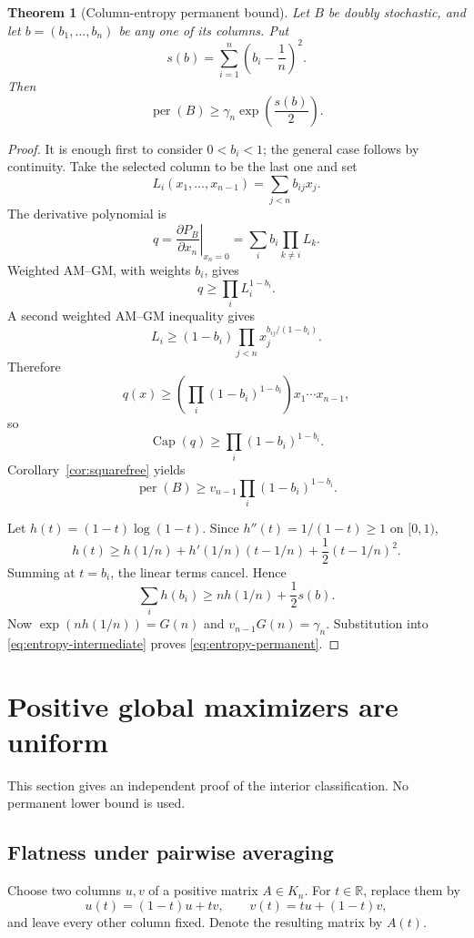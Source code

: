 \documentclass[11pt]{article}
\newtheorem{theorem}{Theorem}[section]
\theoremstyle{definition}
\newcommand{\per}{\operatorname{per}}
\newcommand{\pcap}{\operatorname{Cap}}
\newcommand{\1}{\mathbf{1}}
\begin{document}
\begin{theorem}[Column-entropy permanent bound]\label{thm:column-entropy}
Let $B$ be doubly stochastic, and let $b=(b_1,\dots,b_n)$ be any one of its columns.  Put
\[
 s(b)=\sum_{i=1}^n\left(b_i-\frac1n\right)^2.
\]
Then
\[
 \per(B)\ge\gamma_n\exp\left(\frac{s(b)}2\right).
 \tag{3.10}\label{eq:entropy-permanent}
\]
\end{theorem}

\begin{proof}
It is enough first to consider $0<b_i<1$; the general case follows by continuity.  Take the selected column to be the last one and set
\[
 L_i(x_1,\dots,x_{n-1})=\sum_{j<n}b_{ij}x_j.
\]
The derivative polynomial is
\[
 q=\left.\frac{\partial P_B}{\partial x_n}\right|_{x_n=0}
 =\sum_i b_i\prod_{k\ne i}L_k.
\]
Weighted AM--GM, with weights $b_i$, gives
\[
 q\ge\prod_iL_i^{1-b_i}.
\]
A second weighted AM--GM inequality gives
\[
 L_i\ge(1-b_i)
 \prod_{j<n}x_j^{b_{ij}/(1-b_i)}.
\]
Therefore
\[
 q(x)\ge
 \left(\prod_i(1-b_i)^{1-b_i}\right)x_1\cdots x_{n-1},
\]
so
\[
 \pcap(q)\ge\prod_i(1-b_i)^{1-b_i}.
\]
Corollary~\ref{cor:squarefree} yields
\[
 \per(B)\ge
 v_{n-1}\prod_i(1-b_i)^{1-b_i}.
 \tag{3.11}\label{eq:entropy-intermediate}
\]

Let $h(t)=(1-t)\log(1-t)$.  Since $h''(t)=1/(1-t)\ge1$ on $[0,1)$,
\[
 h(t)\ge h(1/n)+h'(1/n)(t-1/n)+\frac12(t-1/n)^2.
\]
Summing at $t=b_i$, the linear terms cancel.  Hence
\[
 \sum_i h(b_i)
 \ge nh(1/n)+\frac12s(b).
\]
Now $\exp(nh(1/n))=G(n)$ and $v_{n-1}G(n)=\gamma_n$.  Substitution into \eqref{eq:entropy-intermediate} proves \eqref{eq:entropy-permanent}.
\end{proof}

\section{Positive global maximizers are uniform}\label{sec:positive}

This section gives an independent proof of the interior classification.  No permanent lower bound is used.

\subsection{Flatness under pairwise averaging}

Choose two columns $u,v$ of a positive matrix $A\in K_n$.  For $t\in\mathbb R$, replace them by
\[
 u(t)=(1-t)u+tv,
 \qquad
 v(t)=tu+(1-t)v,
 \tag{4.1}\label{eq:pair-path}
\]
and leave every other column fixed.  Denote the resulting matrix by $A(t)$.
\end{document}
